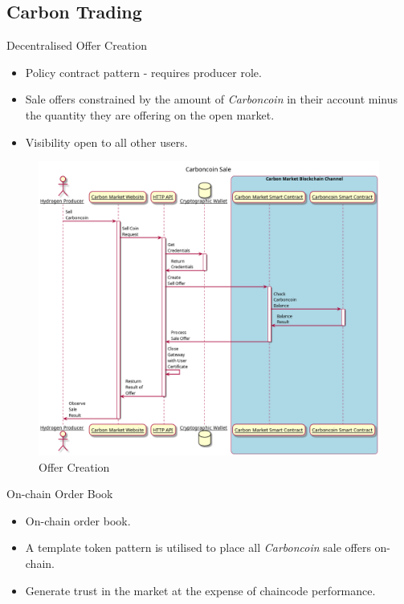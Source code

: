 \subsection{Carbon Trading}
\begin{frame}{Decentralised Offer Creation}
    \begin{itemize}
        \item Policy contract pattern - requires producer role.
        \item Sale offers constrained by the amount of \textit{Carboncoin}
              in their account minus the quantity they are offering on the open
              market.
        \item Visibility open to all other users.
    \end{itemize}
    \begin{figure}
        \caption{Offer Creation}
        \centering
        \includegraphics[height=0.4\textheight, width=0.5\linewidth]
        {figures/CreateSale.png}
    \end{figure}
\end{frame}
\begin{frame}{On-chain Order Book}
    \begin{itemize}
        \item On-chain order book.
        \item A template token pattern is utilised to place all
              \textit{Carboncoin} sale offers on-chain.
        \item Generate trust in the market at the expense of chaincode
              performance.
    \end{itemize}
\end{frame}
